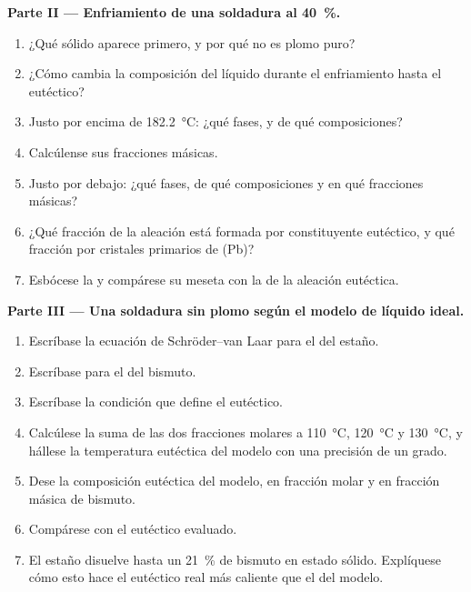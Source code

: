 \begin{problem}
\medskip
\noindent\textbf{Parte II --- Enfriamiento de una soldadura al 40~\%.}
\begin{enumerate}[resume]
  \item ¿Qué sólido aparece primero, y por qué no es plomo puro?
  \item ¿Cómo cambia la composición del líquido durante el enfriamiento hasta
        el eutéctico?
  \item Justo por encima de \qty{182.2}{\degreeCelsius}: ¿qué fases, y de qué
        composiciones?
  \item Calcúlense sus fracciones másicas.
  \item Justo por debajo: ¿qué fases, de qué composiciones y en qué fracciones
        másicas?
  \item ¿Qué fracción de la aleación está formada por constituyente eutéctico, y qué
        fracción por cristales primarios de (Pb)?
  \item Esbócese la  y compárese su meseta con la de la
        aleación eutéctica.
\end{enumerate}

\medskip
\noindent\textbf{Parte III --- Una soldadura sin plomo según el modelo de líquido ideal.}
\begin{enumerate}[resume]
  \item Escríbase la ecuación de Schröder--van Laar para el  del estaño.
  \item Escríbase para el  del bismuto.
  \item Escríbase la condición que define el eutéctico.
  \item Calcúlese la suma de las dos fracciones molares a \qty{110}{\degreeCelsius},
        \qty{120}{\degreeCelsius} y \qty{130}{\degreeCelsius}, y hállese la
        temperatura eutéctica del modelo con una precisión de un grado.
  \item Dese la composición eutéctica del modelo, en fracción molar y en fracción
        másica de bismuto.
  \item Compárese con el eutéctico evaluado.
  \item El estaño disuelve hasta un 21~\% de bismuto en estado sólido. Explíquese cómo esto
        hace el eutéctico real más caliente que el del modelo.
\end{enumerate}


\end{problem}
